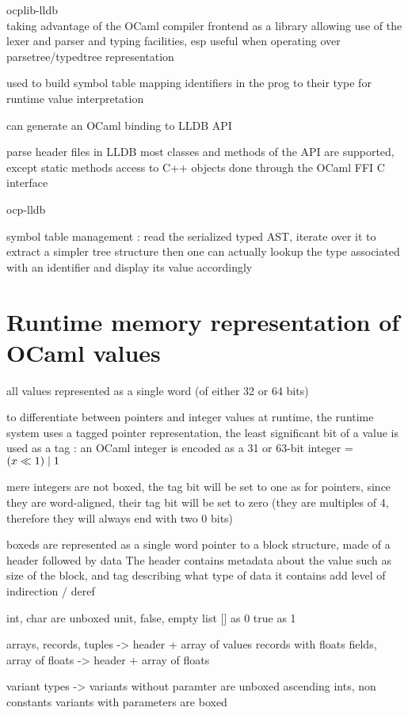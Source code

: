 
ocplib-lldb \\

taking advantage of the OCaml compiler frontend as a library
allowing use of the lexer and parser and typing facilities, esp
useful when operating over parsetree/typedtree representation

used to build symbol table mapping identifiers in the prog to their type
for runtime value interpretation

can generate an OCaml binding to LLDB API

parse header files in LLDB
most classes and methods of the API are supported, except static methods
access to C++ objects done through the OCaml FFI C interface

ocp-lldb

symbol table management :
read the serialized typed AST, iterate over it to extract a simpler tree
structure
then one can actually lookup the type associated with an identifier and display
its value accordingly

\section{Runtime memory representation of OCaml values}

all values represented as a single word (of either 32 or 64 bits)

to differentiate between pointers and integer values at runtime, the runtime
system uses a tagged pointer representation, the least significant bit of a
value is used as a tag : an OCaml integer is encoded as a 31 or 63-bit integer = $ (x \ll 1) \mathrel{|} 1 $

mere integers are not boxed, the tag bit will be set to one
as for pointers, since they are word-aligned, their tag bit will be set to zero
(they are multiples of 4, therefore they will always end with two 0 bits)

\Glspl{boxed} are represented as a single word pointer to a block structure, made of a
header followed by data
The header contains metadata about the value such as size of the block, and tag describing what type of data it
contains
add level of indirection / deref


int, char are unboxed
unit, false, empty list [] as 0
true as 1

arrays, records, tuples -> header + array of values
records with floats fields, array of floats -> header + array of floats

variant types -> variants without paramter are unboxed ascending ints, non
constants variants with parameters are boxed
